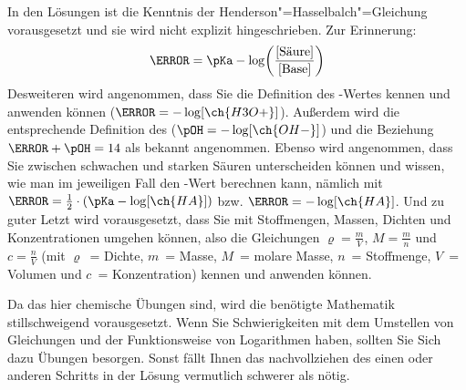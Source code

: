 \documentclass[DIV11]{scrartcl}
\begin{document}
\newpage
{}
In den Lösungen ist die Kenntnis der Henderson"=Hasselbalch"=Gleichung
vorausgesetzt und sie wird nicht explizit hingeschrieben.  Zur Erinnerung:
\[ \pH = \pKa - \log\biggl(\frac{[\text{Säure}]}{[\text{Base}]}\biggr) \]
Desweiteren wird angenommen, dass Sie die Definition des \pH-Wertes kennen und
anwenden können ($\pH = -\log[\ch{H3O+}]$).  Außerdem wird die entsprechende
Definition des \pOH{} ($\pOH = -\log[\ch{OH-}]$) und die Beziehung $\pH + \pOH
= 14$ als bekannt angenommen.  Ebenso wird angenommen, dass Sie zwischen
schwachen und starken Säuren unterscheiden können und wissen, wie man im
jeweiligen Fall den \pH-Wert berechnen kann, nämlich mit $\pH =
\frac{1}{2}\cdot(\pKa - \log[\ch{HA}])$ bzw. $\pH = -\log[\ch{HA}]$.   Und zu
guter Letzt wird vorausgesetzt, dass Sie mit Stoffmengen, Massen, Dichten und
Konzentrationen umgehen können, also die Gleichungen $\varrho = \frac{m}{V}$,
$M = \frac{m}{n}$ und $c = \frac{n}{V}$ (mit $\varrho$~= Dichte, $m$~= Masse,
$M$~= molare Masse, $n$~= Stoffmenge, $V$~= Volumen und $c$~= Konzentration)
kennen und anwenden können.

Da das hier chemische Übungen sind, wird die benötigte Mathematik
stillschweigend vorausgesetzt.  Wenn Sie Schwierigkeiten mit dem Umstellen von
Gleichungen und der Funktionsweise von Logarithmen haben, sollten Sie Sich
dazu Übungen besorgen.  Sonst fällt Ihnen das nachvollziehen des einen oder
anderen Schritts in der Lösung vermutlich schwerer als nötig.

\bigskip

\printsolutions
\end{document}
